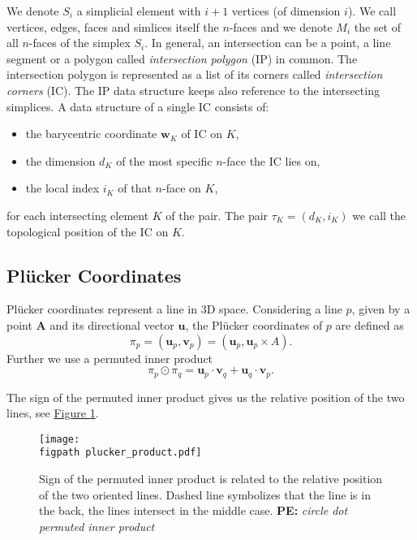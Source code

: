 \documentclass{elsarticle}
\newcommand{\fig}[1]{\hyperref[#1]{Figure \ref{#1}}}
\newcommand{\figpath}{figures/}
\def\vc#1{\mathbf{\boldsymbol{#1}}}     %
\newcommand{\notePE}[1]{{\color{Orange} \textbf{PE: } \textit{#1}}}
\newcommand{\plucker}{Pl\"{u}cker }
\newcommand{\nface}{$n$-face }
\newcommand{\nfaces}{$n$-faces }
\begin{document}
We denote $S_i$ a simplicial element with $i+1$ vertices (of dimension $i$). We call vertices, edges, faces and simlices itself the \nfaces and we denote
$M_i$ the set of all \nfaces of the simplex $S_i$.
In general, an intersection can be a point, a line segment or a polygon called \emph{intersection polygon} (IP) in common.
The intersection polygon is represented as a list of its corners called \emph{intersection corners} (IC). The IP data structure keeps also 
reference to the intersecting simplices. A data structure of a single IC consists of:
\begin{itemize}
 \item the barycentric coordinate $\vc w_K$ of IC on $K$,
 \item the dimension $d_K$ of the most specific \nface the IC lies on,
 \item the local index $i_K$ of that \nface on $K$,
\end{itemize}
for each intersecting element $K$ of the pair. The pair $\tau_K = (d_K, i_K)$
we call the topological position of the IC on $K$.


\subsection{\plucker Coordinates}
\plucker coordinates represent a line in 3D space.
Considering a line $p$, given by a point $\vc A$ and its directional vector $\vc{u}$, 
the \plucker coordinates of $p$ are defined as
\[ \pi_p = (\vc{u}_p, \vc{v}_p) = (\vc{u}_p, \vc{u}_p\times A). \]
Further we use a permuted inner product
\[\pi_p \odot \pi_q = \vc{u}_p\cdot \vc{v}_q + \vc{u}_q \cdot \vc{v}_p. \]

The sign of the permuted inner product gives us the relative position of the two lines, 
see \fig{fig:plucker_products}.



\begin{figure}[!htb]
  \begin{center}        
    \texttt{[image: \\figpath plucker\_product.pdf]}
  \end{center}
  \caption{Sign of the permuted inner product is related to the relative position of the two oriented lines. Dashed line symbolizes that the line is in the back, the lines intersect in the middle case.
           \notePE{circle dot permuted inner product}}
  \label{fig:plucker_products}
\end{figure}
\end{document}
